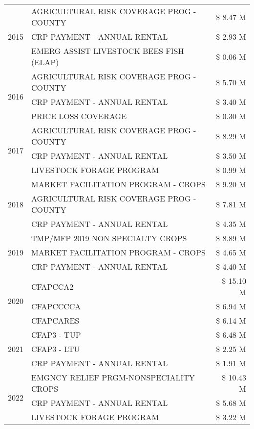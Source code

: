 \begin{tabular}{llr}
\cline{1-3}
\multirow[t]{3}{*}{2015} & AGRICULTURAL RISK COVERAGE PROG - COUNTY & \$ 8.47 M \\
 & CRP PAYMENT - ANNUAL RENTAL & \$ 2.93 M \\
 & EMERG ASSIST LIVESTOCK BEES FISH (ELAP) & \$ 0.06 M \\
\cline{1-3}
\multirow[t]{3}{*}{2016} & AGRICULTURAL RISK COVERAGE PROG - COUNTY & \$ 5.70 M \\
 & CRP PAYMENT - ANNUAL RENTAL & \$ 3.40 M \\
 & PRICE LOSS COVERAGE & \$ 0.30 M \\
\cline{1-3}
\multirow[t]{3}{*}{2017} & AGRICULTURAL RISK COVERAGE PROG - COUNTY & \$ 8.29 M \\
 & CRP PAYMENT - ANNUAL RENTAL & \$ 3.50 M \\
 & LIVESTOCK FORAGE PROGRAM & \$ 0.99 M \\
\cline{1-3}
\multirow[t]{3}{*}{2018} & MARKET FACILITATION PROGRAM - CROPS & \$ 9.20 M \\
 & AGRICULTURAL RISK COVERAGE PROG - COUNTY & \$ 7.81 M \\
 & CRP PAYMENT - ANNUAL RENTAL & \$ 4.35 M \\
\cline{1-3}
\multirow[t]{3}{*}{2019} & TMP/MFP 2019 NON SPECIALTY CROPS & \$ 8.89 M \\
 & MARKET FACILITATION PROGRAM - CROPS & \$ 4.65 M \\
 & CRP PAYMENT - ANNUAL RENTAL & \$ 4.40 M \\
\cline{1-3}
\multirow[t]{3}{*}{2020} & CFAPCCA2 & \$ 15.10 M \\
 & CFAPCCCCA & \$ 6.94 M \\
 & CFAPCARES & \$ 6.14 M \\
\cline{1-3}
\multirow[t]{3}{*}{2021} & CFAP3 - TUP & \$ 6.48 M \\
 & CFAP3 - LTU & \$ 2.25 M \\
 & CRP PAYMENT - ANNUAL RENTAL & \$ 1.91 M \\
\cline{1-3}
\multirow[t]{3}{*}{2022} & EMGNCY RELIEF PRGM-NONSPECIALITY CROPS & \$ 10.43 M \\
 & CRP PAYMENT - ANNUAL RENTAL & \$ 5.68 M \\
 & LIVESTOCK FORAGE PROGRAM & \$ 3.22 M \\
\cline{1-3}
\bottomrule
\end{tabular}
